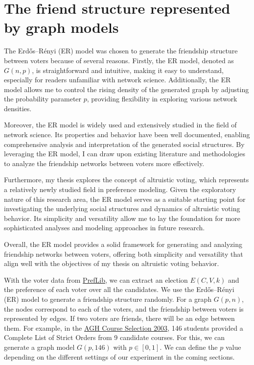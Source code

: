 \documentclass{article}
\begin{document}
\section{The friend structure represented by graph models}

The Erdős–Rényi (ER) model was chosen to generate the friendship structure between voters because of several reasons. Firstly, the ER model, denoted as $G(n,p)$, is straightforward and intuitive, making it easy to understand, especially for readers unfamiliar with network science. Additionally, the ER model allows me to control the rising density of the generated graph by adjusting the probability parameter $p$, providing flexibility in exploring various network densities.

Moreover, the ER model is widely used and extensively studied in the field of network science. Its properties and behavior have been well documented, enabling comprehensive analysis and interpretation of the generated social structures. By leveraging the ER model, I can draw upon existing literature and methodologies to analyze the friendship networks between voters more effectively.

Furthermore, my thesis explores the concept of altruistic voting, which represents a relatively newly studied field in preference modeling. Given the exploratory nature of this research area, the ER model serves as a suitable starting point for investigating the underlying social structures and dynamics of altruistic voting behavior. Its simplicity and versatility allow me to lay the foundation for more sophisticated analyses and modeling approaches in future research.

Overall, the ER model provides a solid framework for generating and analyzing friendship networks between voters, offering both simplicity and versatility that align well with the objectives of my thesis on altruistic voting behavior.

With the voter data from \href{https://www.preflib.org}{PrefLib}, we can extract an election $E (C,V,k)$ and the preference of each voter over all the candidates. We use the Erdős–Rényi (ER) model to generate a friendship structure randomly. For a graph $G(p,n)$, the nodes correspond to each of the voters, and the friendship between voters is represented by edges. If two voters are friends, there will be an edge between them. For example, in the \href{https://www.preflib.org/static/data/agh/00009-00000001.soc}{AGH Course Selection 2003}, 146 students provided a Complete List of Strict Orders from 9 candidate courses. For this, we can generate a graph model $G(p,146)$ with $p \in [0,1]$. We can define the $p$ value depending on the different settings of our experiment in the coming sections.
\end{document}
